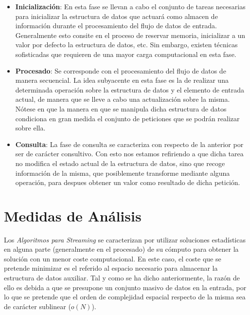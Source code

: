 \documentclass{subfiles}
\begin{document}
      \begin{itemize}

        \item \textbf{Inicialización}: En esta fase se llevan a cabo el conjunto de tareas necesarias para inicializar la estructura de datos que actuará como almacen de información durante el procesamiento del flujo de datos de entrada. Generalmente esto consite en el proceso de reservar memoria, inicializar a un valor por defecto la estructura de datos, etc. Sin embargo, existen técnicas sofisticadas que requieren de una mayor carga computacional en esta fase.

        \item \textbf{Procesado}: Se corresponde con el procesamiento del flujo de datos de manera secuencial. La idea subyacente en esta fase es la de realizar una determinada operación sobre la estructura de datos y el elemento de entrada actual, de manera que se lleve a cabo una actualización sobre la misma. Nótese en que la manera en que se manipula dicha estructura de datos condiciona en gran medida el conjunto de peticiones que se podrán realizar sobre ella.

        \item \textbf{Consulta}: La fase de consulta se caracteriza con respecto de la anterior por ser de carácter consultivo. Con esto nos estamos refiriendo a que dicha tarea no modifica el estado actual de la estructura de datos, sino que recoge información de la misma, que posiblemente transforme mediante alguna operación, para despues obtener un valor como resultado de dicha petición.

      \end{itemize}

    \section{Medidas de Análisis}
    \label{sec:streaming_analysis}

      \paragraph{}
      Los \emph{Algoritmos para Streaming} se caracterizan por utilizar soluciones estadísticas en alguna parte (generalmente en el procesado) de su cómputo para obtener la solución con un menor coste computacional. En este caso, el coste que se pretende minimizar es el referido al espacio necesario para almacenar la estructura de datos auxiliar. Tal y como se ha dicho anteriormente, la razón de ello es debida a que se presupone un conjunto masivo de datos en la entrada, por lo que se pretende que el orden de complejidad espacial respecto de la misma sea de carácter sublinear ($o(N)$).
\end{document}
